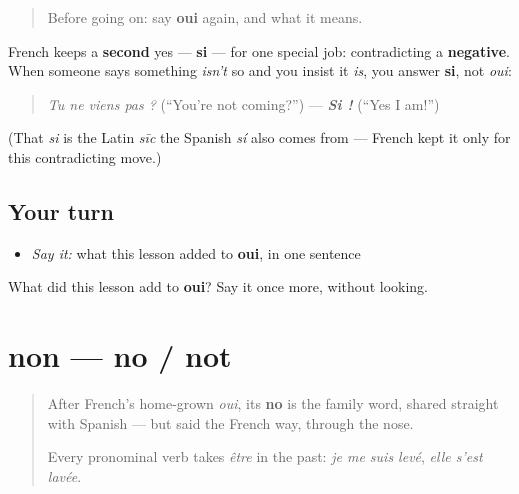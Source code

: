 \begin{quote}
Before going on: say \textbf{oui} again, and what it means.
\end{quote}

\begin{grammarlens}[title={Grammar Lens: The other “yes,” si}]
French keeps a \textbf{second} yes — \textbf{si} — for one special job: contradicting a \textbf{negative}. When someone says something \emph{isn't} so and you insist it \emph{is}, you answer \textbf{si}, not \emph{oui}:

\begin{quote}
\emph{Tu ne viens pas ?} (\textquotedblleft{}You're not coming?\textquotedblright{}) — \emph{\textbf{Si !}} (\textquotedblleft{}Yes I am!\textquotedblright{})
\end{quote}

(That \emph{si} is the Latin \emph{sīc} the Spanish \emph{sí} also comes from — French kept it only for this contradicting move.)
\end{grammarlens}

\subsection*{Your turn}
\begin{itemize}
\raggedright
  \item \emph{Say it:} what this lesson added to \textbf{oui}, in one sentence
\end{itemize}

\begin{tcolorbox}[breakable,colback=teal!4,colframe=teal!35!black,title={Before you move on}]
What did this lesson add to \textbf{oui}? Say it once more, without looking.
\end{tcolorbox}
\section[non]{non — no / not}

\label{lesson:FR-C18-non}



\begin{quote}
After French's home-grown \emph{oui}, its \textbf{no} is the family word, shared straight with Spanish — but said the French way, through the nose.

Every pronominal verb takes \emph{être} in the past: \emph{je me suis levé}, \emph{elle s'est lavée}.
\end{quote}

